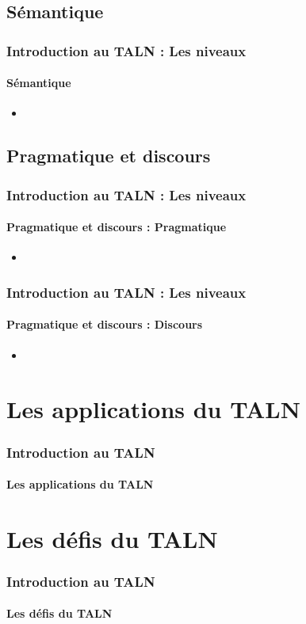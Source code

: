 \documentclass[xcolor=table]{beamer}
\begin{document}
\subsection{Sémantique}

\begin{frame}
\frametitle{Introduction au TALN : Les niveaux}
\framesubtitle{Sémantique}

\begin{itemize}
	\item 
\end{itemize}

\end{frame}

\subsection{Pragmatique et discours}

\begin{frame}
\frametitle{Introduction au TALN : Les niveaux}
\framesubtitle{Pragmatique et discours : Pragmatique}

\begin{itemize}
	\item 
\end{itemize}

\end{frame}

\begin{frame}
\frametitle{Introduction au TALN : Les niveaux}
\framesubtitle{Pragmatique et discours : Discours}

\begin{itemize}
	\item 
\end{itemize}

\end{frame}

\section{Les applications du TALN}

\begin{frame}
\frametitle{Introduction au TALN}
\framesubtitle{Les applications du TALN}

\end{frame}

\section{Les défis du TALN}

\begin{frame}
\frametitle{Introduction au TALN}
\framesubtitle{Les défis du TALN}

\end{frame}



\end{document}
